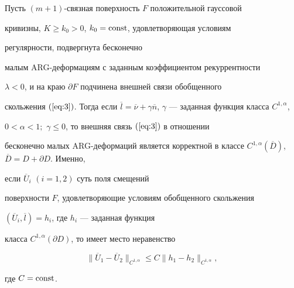 \begin{thm}


Пусть $(m+1)$-связная поверхность $F$ положительной гауссовой


кривизны, $K \ge k_0 > 0$, $k_0=\operatorname{const}$, удовлетворяющая условиям


регулярности, подвергнута бесконечно


малым ARG-деформациям с заданным коэффициентом рекуррентности


$\lambda < 0$, и на краю $\partial F$ подчинена внешней связи обобщенного


скольжения $(\ref{eq:3})$. Тогда если $\overline l=\overline \nu+


\gamma \overline {n}$, $\gamma$ --- заданная функция класса $C^{1,\alpha}$,


$0 < \alpha < 1;$ $\gamma \le 0$, то внешняя связь $(\ref{eq:3})$ в отношении 


бесконечно малых ARG-деформаций является корректной в классе $C^{1,\alpha}


({\overline D })$, $\overline D=D+\partial D$. Именно, 


если $\overline U _i$ $({i=1,2})$ суть поля смещений 


поверхности $F$, удовлетворяющие условиям обобщенного скольжения


$ ({\overline U _i ,\overline l })=h_i $, где $h_i$ --- заданная функция 


класса $C^{1,\alpha } ({\partial D })$, то имеет место неравенство


\begin{equation}\label{eq:8}


\| {\overline U _1 - \overline U _2 } \|_{C^{1,\alpha }} \le 


C \| {h_1 - h_2 } \|_{C^{1,\alpha }} ,


\end{equation}


где $C=\operatorname{const}$.


\end{thm}





